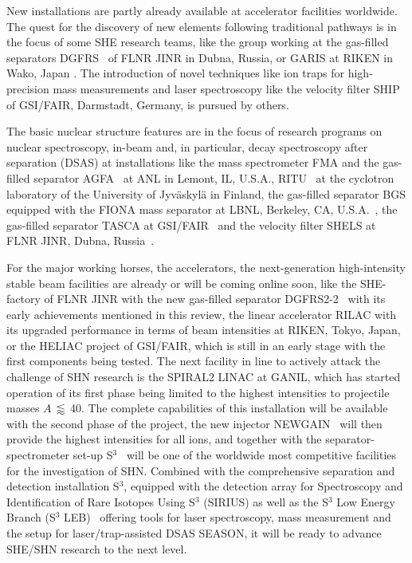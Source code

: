 New installations are partly already available at accelerator facilities worldwide. 
The quest for the discovery of new elements following traditional pathways is in the focus of some SHE research teams, like the group working at the gas-filled separators DGFRS~\cite{Tsyganov1999} of FLNR JINR in Dubna, Russia, or GARIS at RIKEN in Wako, Japan \cite{Morita1992}.  
The introduction of novel techniques like ion traps for high-precision mass measurements and laser spectroscopy like the velocity filter SHIP of GSI/FAIR, Darmstadt, Germany, is pursued by others. 

The basic nuclear structure features are in the focus of research programs on nuclear spectroscopy, in-beam and, in particular, decay spectroscopy after separation (DSAS) at installations like the mass spectrometer FMA \cite{Davids1989} and the gas-filled separator AGFA~\cite{Seweryniak2013} at ANL in Lemont, IL, U.S.A., RITU~\cite{Leino1995} at the cyclotron laboratory of the University of Jyv\"{a}skyl\"{a} in Finland, the gas-filled separator BGS equipped with the FIONA mass separator at LBNL, Berkeley, CA, U.S.A.~\cite{Gates2022}, the gas-filled separator TASCA at GSI/FAIR~\cite{Semchenkov2008} and the velocity filter SHELS at FLNR JINR, Dubna, Russia~\cite{Yeremin2015}. 

For the major working horses, the accelerators, the next-generation high-intensity stable beam facilities are already or will be coming online soon, like the SHE-factory of FLNR JINR with the new gas-filled separator DGFRS2-2~\cite{Oganessian2022a} with its early achievements mentioned in this review, the linear accelerator RILAC with its upgraded performance in terms of beam intensities at RIKEN, Tokyo, Japan, or the HELIAC project of GSI/FAIR, which is still in an early stage with the first components being tested. 
The next facility in line to actively attack the challenge of SHN research is the SPIRAL2 LINAC at GANIL, which has started operation of its first phase being limited to the highest intensities to projectile masses $A$\,$\lessapprox$\,40.
The complete capabilities of this installation will be available with the second phase of the project, the new injector NEWGAIN~\cite{Ackermann2021} will then provide the highest intensities for all ions, and together with the separator-spectrometer set-up S$^3$~\cite{Dechery2015} will be one of the worldwide most competitive facilities for the investigation of SHN. 
Combined with the comprehensive separation and detection installation S$^3$, equipped with the detection array for Spectroscopy and Identification of Rare Isotopes Using S$^3$ (SIRIUS) as well as the S$^3$ Low Energy Branch (S$^3$ LEB)~\cite{Ajayakumar2023} offering tools for laser spectroscopy, mass measurement and the setup for laser/trap-assisted DSAS SEASON, it will be ready to advance SHE/SHN research to the next level.

